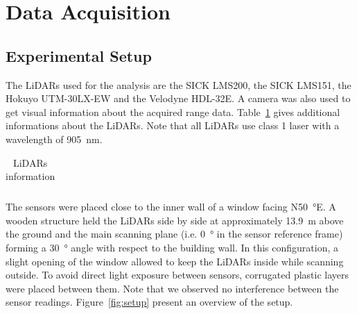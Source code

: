 \section{Data Acquisition}

\subsection{Experimental Setup}
The LiDARs used for the analysis are the SICK LMS200, the SICK LMS151, the Hokuyo UTM-30LX-EW and the Velodyne HDL-32E. A camera was also used to get visual information about the acquired range data. Table~\ref{tab:lidars} gives additional informations about the LiDARs. Note that all LiDARs use class 1 laser with a wavelength of \SI{905}{\nano\meter}.

\begin{table}[htbp]
    \centering
    \begin{tabularx}{\linewidth}{|X||X|X|X|}\hline
    \end{tabularx}
    \caption{LiDARs information}\label{tab:lidars}
\end{table}


The sensors were placed close to the inner wall of a window facing N\SI{50}{\degree}E. A wooden structure held the LiDARs side by side at approximately \SI{13.9}{\meter} above the ground and the main scanning plane (i.e. \SI{0}{\degree} in the sensor reference frame) forming a \SI{30}{\degree} angle with respect to the building wall. In this configuration, a slight opening of the window allowed to keep the LiDARs inside while scanning outside. To avoid direct light exposure between sensors, corrugated plastic layers were placed between them. Note that we observed no interference between the sensor readings. Figure~\ref{fig:setup} present an overview of the setup.

